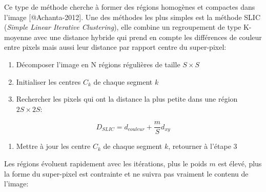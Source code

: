 \documentclass[11pt]{article}
\providecommand{\tightlist}{%
      \setlength{\itemsep}{0pt}\setlength{\parskip}{0pt}}
\begin{document}
Ce type de méthode cherche à former des régions homogènes et compactes
dans l'image {[}@Achanta-2012{]}. Une des méthodes les plus simples est
la méthode SLIC (\emph{Simple Linear Iterative Clustering}), elle
combine un regroupement de type K-moyenne avec une distance hybride qui
prend en compte les différences de couleur entre pixels mais aussi leur
distance par rapport centre du super-pixel:

\begin{enumerate}
\def\labelenumi{\arabic{enumi}.}
\item
  Décomposer l'image en N régions régulières de taille \(S \times S\)
\item
  Initialiser les centres \(C_k\) de chaque segment \(k\)
\item
  Rechercher les pixels qui ont la distance la plus petite dans une
  région \(2S \times 2S\):
\end{enumerate}

\[
D_{SLIC}= d_{couleur} + \frac{m}{S}d_{xy}
\]

\begin{enumerate}
\def\labelenumi{\arabic{enumi}.}
\setcounter{enumi}{2}
\tightlist
\item
  Mettre à jour les centre \(C_k\) de chaque segment \(k\), retourner à
  l'étape 3
\end{enumerate}

Les régions évoluent rapidement avec les itérations, plus le poids \(m\)
est élevé, plus la forme du super-pixel est contrainte et ne suivra pas
vraiment le contenu de l'image:
\end{document}
